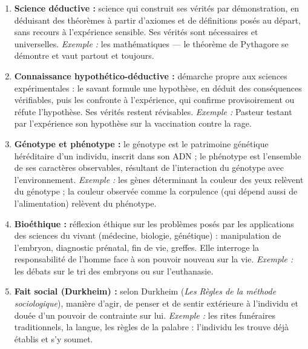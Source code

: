 \documentclass[11pt]{article}
\begin{document}
\begin{corrige}
\begin{enumerate}
\item \textbf{Science déductive :} science qui construit ses vérités par démonstration, en déduisant des théorèmes à partir d'axiomes et de définitions posés au départ, sans recours à l'expérience sensible. Ses vérités sont nécessaires et universelles. \emph{Exemple :} les mathématiques — le théorème de Pythagore se démontre et vaut partout et toujours.
\item \textbf{Connaissance hypothético-déductive :} démarche propre aux sciences expérimentales : le savant formule une hypothèse, en déduit des conséquences vérifiables, puis les confronte à l'expérience, qui confirme provisoirement ou réfute l'hypothèse. Ses vérités restent révisables. \emph{Exemple :} Pasteur testant par l'expérience son hypothèse sur la vaccination contre la rage.
\item \textbf{Génotype et phénotype :} le génotype est le patrimoine génétique héréditaire d'un individu, inscrit dans son ADN ; le phénotype est l'ensemble de ses caractères observables, résultant de l'interaction du génotype avec l'environnement. \emph{Exemple :} les gènes déterminant la couleur des yeux relèvent du génotype ; la couleur observée comme la corpulence (qui dépend aussi de l'alimentation) relèvent du phénotype.
\item \textbf{Bioéthique :} réflexion éthique sur les problèmes posés par les applications des sciences du vivant (médecine, biologie, génétique) : manipulation de l'embryon, diagnostic prénatal, fin de vie, greffes. Elle interroge la responsabilité de l'homme face à son pouvoir nouveau sur la vie. \emph{Exemple :} les débats sur le tri des embryons ou sur l'euthanasie.
\item \textbf{Fait social (Durkheim) :} selon Durkheim (\emph{Les Règles de la méthode sociologique}), manière d'agir, de penser et de sentir extérieure à l'individu et douée d'un pouvoir de contrainte sur lui. \emph{Exemple :} les rites funéraires traditionnels, la langue, les règles de la palabre : l'individu les trouve déjà établis et s'y soumet.
\end{enumerate}
\end{corrige}
\end{document}
